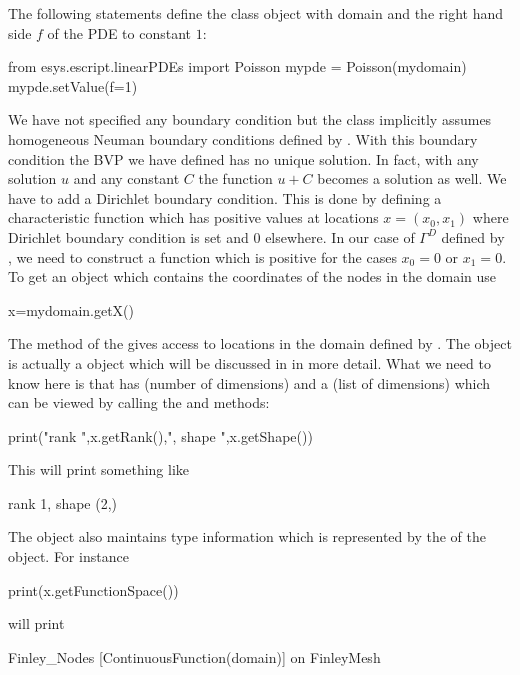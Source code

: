The following statements define the \Poisson class object  with domain  and
the right hand side $f$ of the PDE to constant $1$: 
\begin{python}
  from esys.escript.linearPDEs import Poisson
  mypde = Poisson(mydomain)
  mypde.setValue(f=1)
\end{python}
We have not specified any boundary condition but the \Poisson class implicitly
assumes homogeneous Neuman boundary conditions defined by .
With this boundary condition the BVP we have
defined has no unique solution.
In fact, with any solution $u$ and any constant $C$ the function $u+C$ becomes
a solution as well.
We have to add a Dirichlet boundary condition.
This is done by defining a characteristic function
which has positive values at locations $x=(x_{0},x_{1})$
where Dirichlet boundary condition is set and $0$ elsewhere.
In our case of $\Gamma^D$ defined by , we need to
construct a function  which is positive for the cases $x_{0}=0$ or $x_{1}=0$.
To get an object  which contains the coordinates of the nodes in the domain use
\begin{python}
  x=mydomain.getX() 
\end{python}
The method  of the \Domain {} gives access to locations
in the domain defined by .
The object  is actually a \Data object which will be discussed in
 in more detail.
What we need to know here is that  has \Rank (number of dimensions) and
a \Shape (list of dimensions) which can be viewed by calling the  and  methods:
\begin{python}
  print("rank ",x.getRank(),", shape ",x.getShape())
\end{python}
This will print something like
\begin{python}
  rank 1, shape (2,)
\end{python}
The \Data object also maintains type information which is represented by the 
\FunctionSpace of the object. For instance
\begin{python}
  print(x.getFunctionSpace())
\end{python}
will print 
\begin{python}
  Finley_Nodes [ContinuousFunction(domain)] on FinleyMesh 
\end{python}
